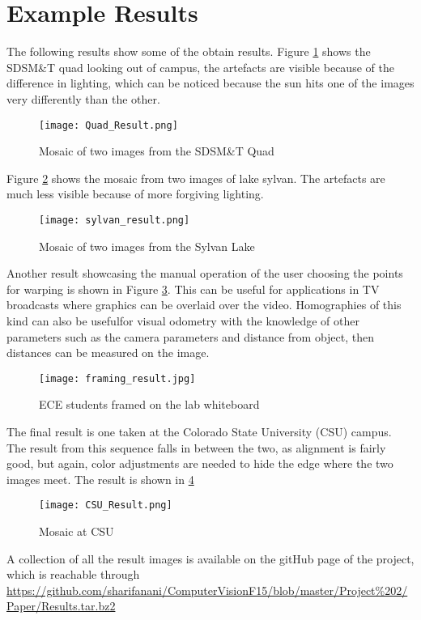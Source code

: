\documentclass[10pt,twocolumn,letterpaper]{article}
\begin{document}
\section{Example Results}
The following results show some of the obtain results. Figure \ref{fig:quad} shows the SDSM\&T quad looking out of campus, the artefacts are visible because of the difference in lighting, which can be noticed because the sun hits one of the images very differently than the other.
\begin{center}
\begin{figure}[!!!!h]
\texttt{[image: Quad\_Result.png]}
\caption{Mosaic of two images from the SDSM\&T Quad}
\label{fig:quad}
\end{figure}
\end{center}
Figure \ref{fig:lake} shows the mosaic from two images of lake sylvan. The artefacts are much less visible because of more forgiving lighting.
\begin{figure}[h!]
\texttt{[image: sylvan\_result.png]}
\caption{Mosaic of two images from the Sylvan Lake}
\label{fig:lake}
\end{figure}
\newpage
Another result showcasing the manual operation of the user choosing the points for warping is shown in Figure \ref{fig:conrad}. This can be useful for applications in TV broadcasts where graphics can be overlaid over the video. Homographies of this kind can also be usefulfor visual odometry with the knowledge of other parameters such as the camera parameters and distance from object, then distances can be measured on the image.
\begin{center}
\begin{figure}[!!!!h]
\texttt{[image: framing\_result.jpg]}
\caption{ECE students framed on the lab whiteboard}
\label{fig:conrad}
\end{figure}
\end{center}
The final result is one taken at the Colorado State University (CSU) campus. The result from this sequence falls in between the two, as alignment is fairly good, but again, color adjustments are needed to hide the edge where the two images meet. The result is shown in \ref{fig:CSU}
\begin{center}
\begin{figure}[!!!!h]
\texttt{[image: CSU\_Result.png]}
\caption{Mosaic at CSU}
\label{fig:CSU}
\end{figure}
\end{center}
A collection of all the result images is available on the gitHub page of the project, which is reachable through \url{https://github.com/sharifanani/ComputerVisionF15/blob/master/Project%202/Paper/Results.tar.bz2}
\end{document}
